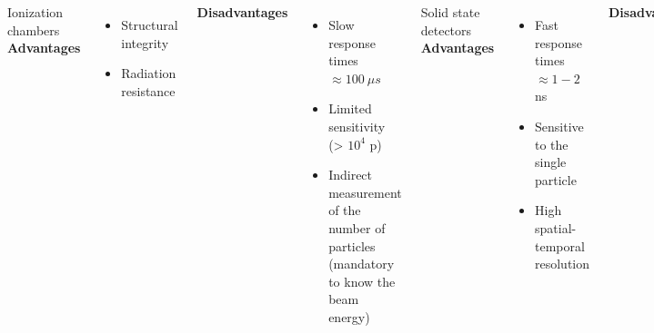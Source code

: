 \documentclass[aspectratio=169]{beamer}
\begin{document}
\begin{frame}
\begin{columns}
\begin{center}
			\end{center}
			{\color{blue} Ionization chambers}
			\newline
			\textbf{Advantages}
			\begin{itemize}
				\item Structural integrity
				\item Radiation resistance
			\end{itemize}
			\textbf{Disadvantages}
			\begin{itemize}
				\item Slow response times $\approx 100\:\mu s$
				\item Limited sensitivity (> $10^4$ p)
				\item Indirect measurement of the number of particles  (mandatory to know the beam energy)
			\end{itemize}
			{\color{blue} Solid state detectors}
			\newline
			\textbf{Advantages}
			\begin{itemize}
				\item Fast response times $\approx 1-2$ ns
				\item Sensitive to the single particle
				\item High spatial-temporal resolution
			\end{itemize}
			\textbf{Disadvantages}
			\begin{itemize}
				\item Complex and fast readout electronics
				\item Damage from radiation
				\item pile-up effects at high\newline rates
			\end{itemize}
		\end{columns}
	\end{frame}
\end{document}
